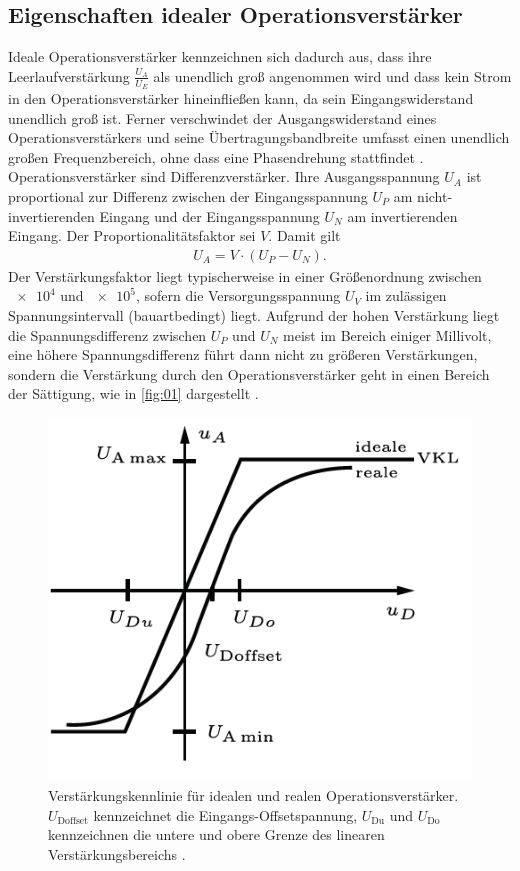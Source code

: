 \subsection{Eigenschaften idealer Operationsverstärker}
Ideale Operationsverstärker kennzeichnen sich dadurch aus, dass ihre
Leerlaufverstärkung $\frac{U_A}{U_E}$ als unendlich groß angenommen wird und
dass kein Strom in den Operationsverstärker hineinfließen kann, da sein
Eingangswiderstand unendlich groß ist. Ferner verschwindet der
Ausgangswiderstand eines Operationsverstärkers und seine Übertragungsbandbreite
umfasst einen unendlich großen Frequenzbereich, ohne dass eine Phasendrehung
stattfindet \cite{federau}. \\
\noindent Operationsverstärker sind Differenzverstärker. Ihre Ausgangsspannung $U_A$
ist proportional zur Differenz zwischen der Eingangsspannung $U_P$ am
nicht-invertierenden Eingang und der Eingangsspannung $U_N$ am
invertierenden Eingang. Der Proportionalitätsfaktor sei $V$. Damit gilt
\begin{align}
  U_A = V \cdot \left(U_P - U_N \right).
  \label{eqn:01}
\end{align}
\noindent Der Verstärkungsfaktor liegt typischerweise in einer Größenordnung
zwischen $\num{e4}$ und $\num{e5}$, sofern die Versorgungsspannung $U_V$ im
zulässigen Spannungsintervall (bauartbedingt) liegt. Aufgrund der hohen
Verstärkung liegt die Spannungsdifferenz zwischen $U_P$ und $U_N$ meist im
Bereich einiger Millivolt, eine höhere Spannungsdifferenz führt dann nicht
zu größeren Verstärkungen, sondern die Verstärkung durch den Operationsverstärker
geht in einen Bereich der Sättigung, wie in \autoref{fig:01} dargestellt \cite{hs-fulda}.
\begin{figure}
  \centering
  \includegraphics[scale=0.5]{ressources/figure_01.png}
  \caption{Verstärkungskennlinie für idealen und realen Operationsverstärker. $U_\text{Doffset}$
  kennzeichnet die Eingangs-Offsetspannung, $U_\text{Du}$ und $U_\text{Do}$ kennzeichnen
  die untere und obere Grenze des linearen Verstärkungsbereichs \cite{elektrotechnik}.}
  \label{fig:01}
\end{figure}
